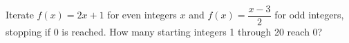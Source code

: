 Iterate $ f(x)=2x+1 $ for even integers $ x $ and $ f(x)=\dfrac{x-3}{2}$ for odd integers, stopping if 0 is reached. How many starting integers 1 through 20 reach 0?
